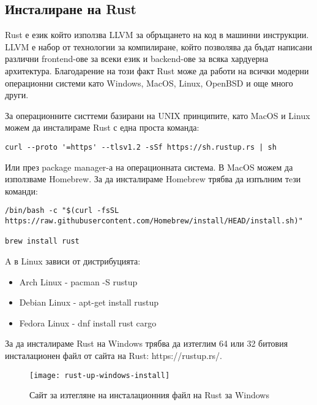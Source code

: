 \subsection{Инсталиране на Rust}
Rust е език който използва LLVM за обръщането на код в машинни инструкции.
LLVM е набор от технологии за компилиране, който позволява да бъдат написани
различни frontend-ове за всеки език и backend-ове за всяка хардуерна архитектура.
Благодарение на този факт Rust може да работи на всички модерни операционни системи
като Windows, MacOS, Linux, OpenBSD и още много други.

За операционните систтеми базирани на UNIX принципите, като MacOS и Linux можем
да инсталираме Rust с една проста команда:
\begin{lstlisting}
curl --proto '=https' --tlsv1.2 -sSf https://sh.rustup.rs | sh
\end{lstlisting}

Или през package manager-а на операционната система.
В MacOS можем да използваме Homebrew. За да инсталираме Homebrew трябва да изпълним тeзи команди:
\begin{lstlisting}
/bin/bash -c "$(curl -fsSL https://raw.githubusercontent.com/Homebrew/install/HEAD/install.sh)"

brew install rust
\end{lstlisting}

A в Linux зависи от дистрибуцията:
\begin{itemize}
\item Arch Linux - pacman -S rustup
\item Debian Linux - apt-get install rustup
\item Fedora Linux - dnf install rust cargo
\end{itemize}

За да инсталираме Rust на Windows трябва да изтеглим 64 или 32 битовия
инсталационен файл от сайта на Rust: https://rustup.rs/. 

\begin{figure}[!htb]
  \texttt{[image: rust-up-windows-install]}
  \centering
  \caption{Сайт за изтегляне на инсталационния файл на Rust за Windows}
  \label{fig:rust-up-windows-install}
\end{figure}
